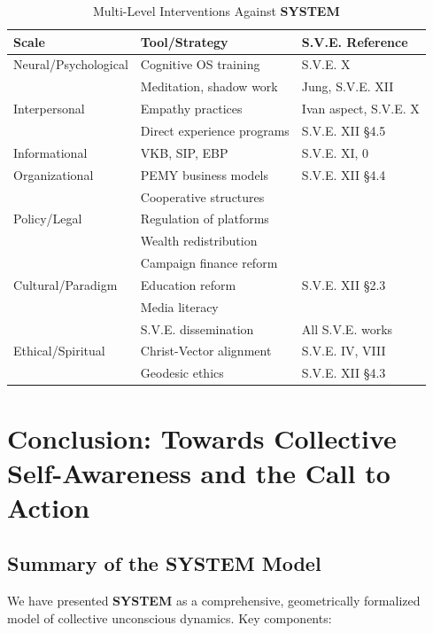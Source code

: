 \documentclass[11pt,a4paper]{article}
\newcommand{\SYSTEM}{\textbf{SYSTEM}}
\theoremstyle{definition}
\theoremstyle{remark}
\begin{document}
\begin{table}[H]
\centering
\caption{Multi-Level Interventions Against \SYSTEM{}}
\label{tab:interventions}
\begin{tabular}{@{}lll@{}}
\toprule
\textbf{Scale} & \textbf{Tool/Strategy} & \textbf{S.V.E. Reference} \\ \midrule
Neural/Psychological & Cognitive OS training & S.V.E. X \cite{sve10} \\
 & Meditation, shadow work & Jung, S.V.E. XII \\
Interpersonal & Empathy practices & Ivan aspect, S.V.E. X \\
 & Direct experience programs & S.V.E. XII \S 4.5 \\
Informational & VKB, SIP, EBP & S.V.E. XI, 0 \cite{sve11, sve0} \\
Organizational & PEMY business models & S.V.E. XII \S 4.4 \\
 & Cooperative structures & \\
Policy/Legal & Regulation of platforms & \\
 & Wealth redistribution & \\
 & Campaign finance reform & \\
Cultural/Paradigm & Education reform & S.V.E. XII \S 2.3 \\
 & Media literacy & \\
 & S.V.E. dissemination & All S.V.E. works \\
Ethical/Spiritual & Christ-Vector alignment & S.V.E. IV, VIII \cite{sve4, sve8} \\
 & Geodesic ethics & S.V.E. XII \S 4.3 \\ \bottomrule
\end{tabular}
\end{table}


\section{Conclusion: Towards Collective Self-Awareness and the Call to Action}

\subsection{Summary of the \SYSTEM{} Model}

We have presented \SYSTEM{} as a comprehensive, geometrically formalized model of collective unconscious dynamics. Key components:
\end{document}
